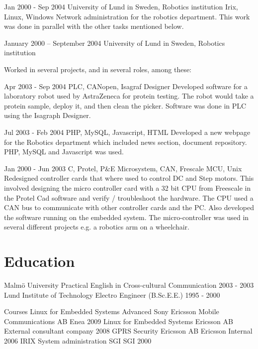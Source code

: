 \documentclass[a4paper]{article}
\begin{document}
Jan 2000 - Sep 2004
University of Lund in Sweden, Robotics institution		
Irix, Linux, Windows
Network administration for the robotics department. This work was done in parallel with the other tasks mentioned below.
 

January 2000 – September 2004
University of Lund in Sweden, Robotics institution

Worked in several projects, and in several roles, among these:

Apr 2003 - Sep 2004	
PLC, CANopen, Isagraf Designer
Developed software for a laboratory robot used by AstraZeneca for protein testing. The robot would take a protein sample, deploy it, and then clean the picker. Software was done in PLC using the Isagraph Designer.
 
Jul 2003 - Feb 2004
PHP, MySQL, Javascript, HTML
Developed a new webpage for the Robotics department which included news section, document repository. PHP, MySQL and Javascript was used. 
 
Jan 2000 - Jun 2003
C, Protel, P\&E Microsystem, CAN, Frescale MCU, Unix
Redesigned  controller cards that where used to control DC and Step motors. This involved designing    the micro controller card with a 32 bit CPU from Freescale in the Protel Cad software and verify / troubleshoot the hardware. The CPU used a CAN bus to communicate with other controller cards and the PC.  Also developed the software running on the embedded system. The micro-controller was used in several different projects e.g. a robotics arm on a wheelchair.


\section{Education}

Malmö University	Practical English in Cross-cultural Communication	2003 - 2003			
Lund Institute of Technology	Electro Engineer (B.Sc.E.E.)	1995 - 2000			

Courses
Linux for Embedded Systems Advanced	Sony Ericsson Mobile Communications AB	Enea	2009		
Linux for Embedded Systems	            Ericsson AB	External consultant company	     	2008		
GPRS Security				Ericsson AB	Ericsson Internal			2006	
IRIX System administration	SGI		SGI							2000
\end{document}
